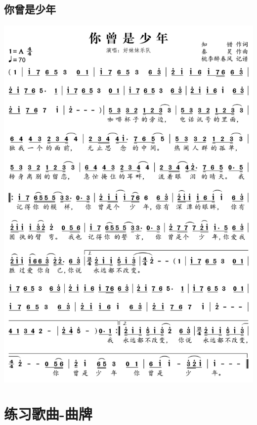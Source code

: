 \documentclass[cn,pad,chinesefont=nofont]{elegantbook}
\begin{document}
\section{你曾是少年}
    \includegraphics[width=\textwidth]{dongxiao/20200516-好妹妹-你曾是少年.jpg} 
    
\chapter{练习歌曲-曲牌}
\end{document}
